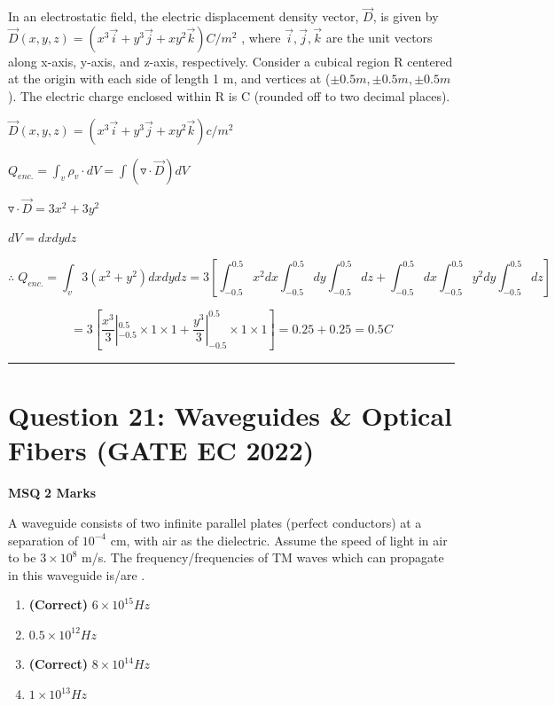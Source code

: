 \documentclass[11pt,a4paper]{article}
\begin{document}
\noindent In an electrostatic field, the electric displacement density vector, $\vec{D}$, is given by
$\vec{D}(x,y,z)=(x^3\vec{i}+y^3\vec{j}+xy^2\vec{k})C/m^2$
,
where $\vec{i},\vec{j},\vec{k}$ are the unit vectors along x-axis, y-axis, and z-axis, respectively.
Consider a cubical region R centered at the origin with each side of length 1 m, and
vertices at ($\pm 0.5 m, \pm 0.5 m, \pm 0.5 m$). The electric charge enclosed within R is
\underline{\hspace{1.5cm}} C (rounded off to two decimal places).


\begin{tcolorbox}[solbox, title=Detailed Solution -- Question 20]
$\vec{D}(x,y,z)=(x^3\vec{i}+y^3\vec{j}+xy^2\vec{k})c/m^2$

$Q_{enc.}=\int _v \rho _v\cdot dV=\int (\triangledown \cdot \vec{D})dV$

$\triangledown \cdot \vec{D}=3x^2+3y^2$

$dV=dxdydz$

\[
\therefore \; Q_{enc.}=\int _v 3(x^2+y^2)dxdydz =3\left [ \int_{-0.5}^{0.5} x^2 dx  \int_{-0.5}^{0.5}dy \int_{-0.5}^{0.5} dz+\int_{-0.5}^{0.5}dx\int_{-0.5}^{0.5}y^2dy\int_{-0.5}^{0.5}dz \right ]
\]

\[
=3\left [ \frac{x^3}{3}|_{-0.5}^{0.5} \times 1 \times 1 + \frac{y^3}{3}|_{-0.5}^{0.5} \times 1 \times 1\right ] =0.25+0.25=0.5C
\]
\end{tcolorbox}

\vspace{1.5em}
\hrule
\vspace{1.5em}

\section*{Question 21: Waveguides \& Optical Fibers (GATE EC 2022)}
\noindent \textbf{\color{primary}MSQ} \hfill \textbf{\color{secondary}2 Marks}


\noindent A waveguide consists of two infinite parallel plates (perfect conductors) at a
separation of $10^{-4}$ cm, with air as the dielectric. Assume the speed of light in air to
be $3 \times  10^{8}$ m/s. The frequency/frequencies of TM waves which can propagate in
this waveguide is/are \underline{\hspace{1.5cm}}.


\begin{enumerate}[label=(\Alph*)]
    \item \textbf{(Correct)} $6 \times 10^{15}Hz$
    \item $0.5 \times 10^{12}Hz$
    \item \textbf{(Correct)} $8 \times 10^{14}Hz$
    \item $1 \times 10^{13}Hz$
\end{enumerate}
\end{document}
